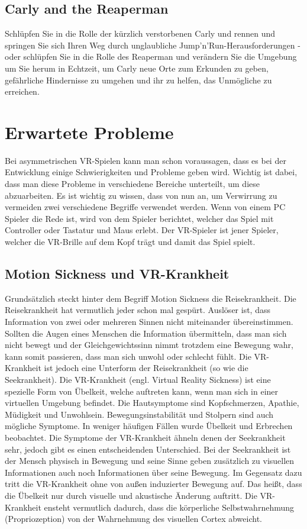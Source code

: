 \subsection{Carly and the Reaperman}
Schlüpfen Sie in die Rolle der kürzlich verstorbenen Carly und rennen und springen Sie sich Ihren Weg durch unglaubliche Jump'n'Run-Herausforderungen - oder schlüpfen Sie in die Rolle des Reaperman und verändern Sie die Umgebung um Sie herum in Echtzeit, um Carly neue Orte zum Erkunden zu geben, gefährliche Hindernisse zu umgehen und ihr zu helfen, das Unmögliche zu erreichen.

\section{Erwartete Probleme}
Bei asymmetrischen VR-Spielen kann man schon voraussagen, dass es bei der Entwicklung einige Schwierigkeiten und Probleme geben wird. Wichtig ist dabei, dass man diese Probleme in verschiedene Bereiche unterteilt, um diese abzuarbeiten. Es ist wichtig zu wissen, dass von nun an, um Verwirrung zu vermeiden zwei verschiedene Begriffe verwendet werden. Wenn von einem PC Spieler die Rede ist, wird von dem Spieler berichtet, welcher das Spiel mit Controller oder Tastatur und Maus erlebt. Der VR-Spieler ist jener Spieler, welcher die VR-Brille auf dem Kopf trägt und damit das Spiel spielt. 

\subsection{Motion Sickness und VR-Krankheit}
Grundsätzlich steckt hinter dem Begriff Motion Sickness die Reisekrankheit. Die Reisekrankheit hat vermutlich jeder schon mal gespürt. Auslöser ist, dass Information von zwei oder mehreren Sinnen nicht miteinander übereinstimmen. Sollten die Augen eines Menschen die Information übermitteln, dass man sich nicht bewegt und der Gleichgewichtssinn nimmt trotzdem eine Bewegung wahr, kann somit passieren, dass man sich unwohl oder schlecht fühlt. Die VR-Krankheit ist jedoch eine Unterform der Reisekrankheit (so wie die Seekrankheit).
Die VR-Krankheit (engl. Virtual Reality Sickness) ist eine spezielle Form von Übelkeit, welche auftreten kann, wenn man sich in einer virtuellen Umgebung befindet. Die Hautsymptome sind Kopfschmerzen, Apathie, Müdigkeit und Unwohlsein. Bewegungsinstabilität und Stolpern sind auch mögliche Symptome. In weniger häufigen Fällen wurde Übelkeit und Erbrechen beobachtet. Die Symptome der VR-Krankheit ähneln denen der Seekrankheit sehr, jedoch gibt es einen entscheidenden Unterschied. Bei der Seekrankheit ist der Mensch physisch in Bewegung und seine Sinne geben zusätzlich zu visuellen Informationen auch noch Informationen über seine Bewegung. Im Gegensatz dazu tritt die VR-Krankheit ohne von außen induzierter Bewegung auf. Das heißt, dass die Übelkeit nur durch visuelle und akustische Änderung auftritt. Die VR-Krankheit ensteht vermutlich dadurch, dass die körperliche Selbstwahrnehmung (Propriozeption) von der Wahrnehmung des visuellen Cortex abweicht.

